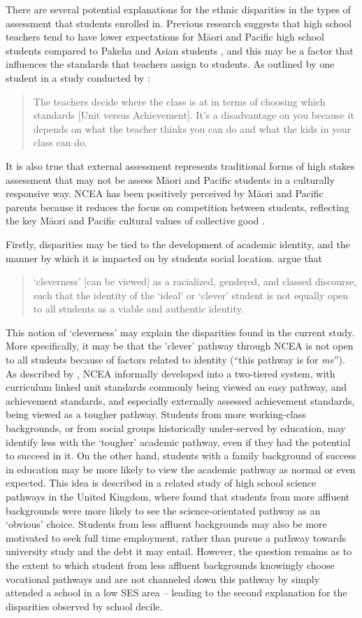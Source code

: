 \documentclass[a4paper]{article}
\begin{document}
There are several potential explanations for the ethnic disparities in the types of assessment that students enrolled in. Previous research suggests that high school teachers tend to have lower expectations for M\={a}ori and Pacific high school students compared to Pakeha and Asian students \cite{turner2015teacher}, and this may be a factor that influences the standards that teachers assign to students. As outlined by one student in a study conducted by \cite{graham2010Maori}:
\blockquote{The teachers decide where the class is at in terms of choosing which standards [Unit versus Achievement]. It's a disadvantage on you because
it depends on what the teacher thinks you can do and what the kids in your class can do.}.  It is also true that external assessment represents traditional forms of high stakes assessment that may not be assess M\={a}ori and Pacific students in a culturally responsive way. NCEA has been positively perceived by M\={a}ori and Pacific parents because it reduces the focus on competition between students, reflecting the key M\={a}ori and Pacific cultural values of collective good \cite{graham2010Maori}.

Firstly, disparities may be tied to the development of academic identity, and the manner by which it is impacted on by students social location. \citep[p.216]{Archer2014} argue that \blockquote{`cleverness' [can be viewed] as a racialized, gendered, and classed discourse, such that the identity of the `ideal' or `clever' student is not equally open to all students as a viable and authentic identity. }
This notion of `cleverness' may explain the disparities found in the current study. More specifically, it may be that the 'clever' pathway through NCEA is not open to all students because of factors related to identity (``this pathway is for \textit{me}''). As described by \cite{hipkins2016ncea}, NCEA informally developed into a two-tiered system, with curriculum linked unit standards commonly being viewed an easy pathway, and achievement standards, and especially externally assessed achievement standards, being viewed as a tougher pathway. Students from more working-class backgrounds, or from social groups historically under-served by education, may identify less with the `tougher' academic pathway, even if they had the potential to succeed in it. On the other hand, students with a family background of success in education may be more likely to view the academic pathway as normal or even expected. This idea is described in a related study of high school science pathways in the United Kingdom, where \cite{archer2017stratifying} found that students from more affluent backgrounds were more likely to see the science-orientated pathway as an `obvious' choice. Students from less affluent backgrounds may also be more motivated to seek full time employment, rather than pursue a pathway towards university study and the debt it may entail. However, the question remains as to the extent to which student from less affluent backgrounds knowingly choose vocational pathways and are not channeled down this pathway by simply attended a school in a low SES area -- leading to the second explanation for the disparities observed by school decile.  
\end{document}
